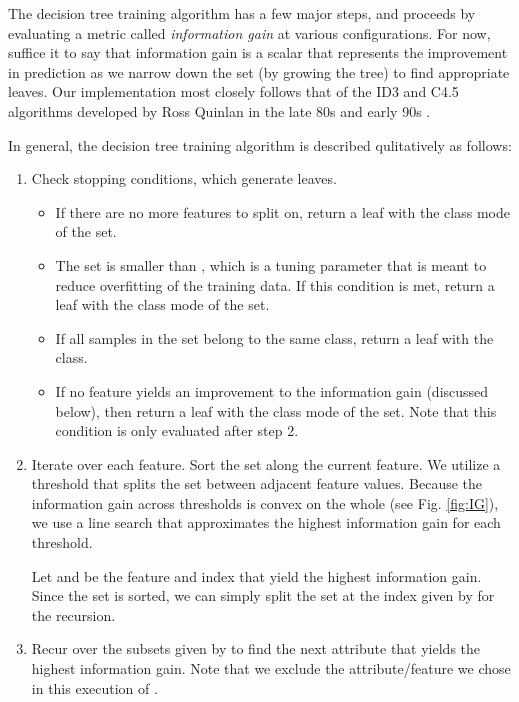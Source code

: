 The decision tree training algorithm has a few major steps, and proceeds by evaluating a metric called \emph{information gain} at various configurations. For now, suffice it to say that information gain is a scalar that represents the improvement in prediction as we narrow down the set (by growing the tree) to find appropriate leaves. Our implementation most closely follows that of the ID3 and C4.5 algorithms developed by Ross Quinlan in the late 80s and early 90s \cite{wiki:id3} \cite{wiki:c45}.

\pagebreak
In general, the decision tree training algorithm is described qulitatively as follows:
%
\begin{enumerate}
\item Check stopping conditions, which generate leaves.
%
  \begin{itemize}
  \item If there are no more features to split on, return a leaf with the class mode of the set. 
  \item The set is smaller than , which is a tuning parameter that is meant to reduce overfitting of the training data. If this condition is met, return a leaf with the class mode of the set.
  \item If all samples in the set belong to the same class, return a leaf with the class.
  \item If no feature yields an improvement to the information gain (discussed below), then return a leaf with the class mode of the set. Note that this condition is only evaluated after step 2. 
  \end{itemize}
\item Iterate over each feature. Sort the set along the current feature. We utilize a threshold that splits the set between adjacent feature values. Because the information gain across thresholds is convex on the whole (see Fig. \ref{fig:IG}), we use a line search that approximates the highest information gain for each threshold. 

  Let  and  be the feature and index that yield the highest information gain. Since the set is sorted, we can simply split the set at the index given by  for the recursion.
\item Recur over the subsets given by  to find the next attribute that yields the highest information gain. Note that we exclude the attribute/feature we chose in this execution of . 
\end{enumerate}

